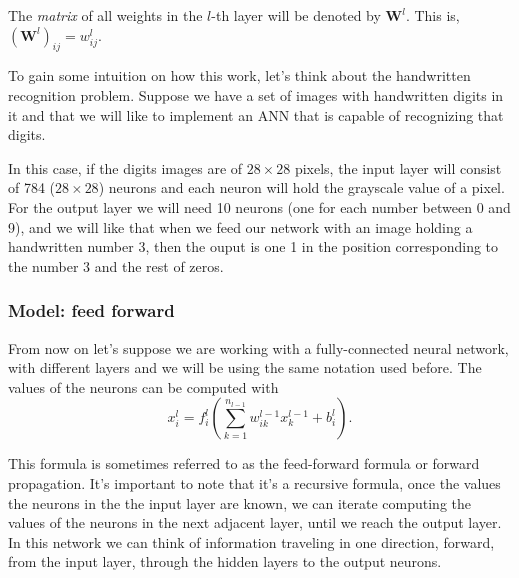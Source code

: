 The \emph{matrix} of all weights in the \(l\)-th layer will be denoted by
\(\mathbf{W}^l\). This is, \((\mathbf{W}^l)_{ij} = w_{ij}^ l\).

\begin{exampleBox}
  To gain some intuition on how this work, let's think about the handwritten
  recognition problem. Suppose we have a set of images with handwritten digits
  in it and that we will like to implement an ANN that is capable of
  recognizing that digits.

  In this case, if the digits images are of \(28 \times 28\) pixels, the input
  layer will consist of 784 (\(28 \times 28\)) neurons and each neuron will
  hold the grayscale value of a pixel. For the output layer we will need 10
  neurons (one for each number between 0 and 9), and we will like that when we
  feed our network with an image holding a handwritten number 3, then the ouput
  is one 1 in the position corresponding to the number 3 and the rest of zeros.
\end{exampleBox}

\subsubsection{Model: feed forward}\label{subsec:forward}
From now on let's suppose we are working with a fully-connected neural network,
with different layers and we will be using the same notation used before. The
values of the neurons can be computed with
\begin{equation}
  x_i^l = f_i^l \left(
    \sum_{k=1}^{n_{l-1}} w_{ik}^{l-1} x_{k}^{l-1} + b_i^l
  \right).
\end{equation}

This formula is sometimes referred to as the feed-forward formula or forward
propagation. It's important to note that it's a recursive formula, once the
values the neurons in the the input layer are known, we can iterate computing
the values of the neurons in the next adjacent layer, until we reach the output
layer. In this network we can think of information traveling in one direction,
forward, from the input layer, through the hidden layers to the output neurons.

